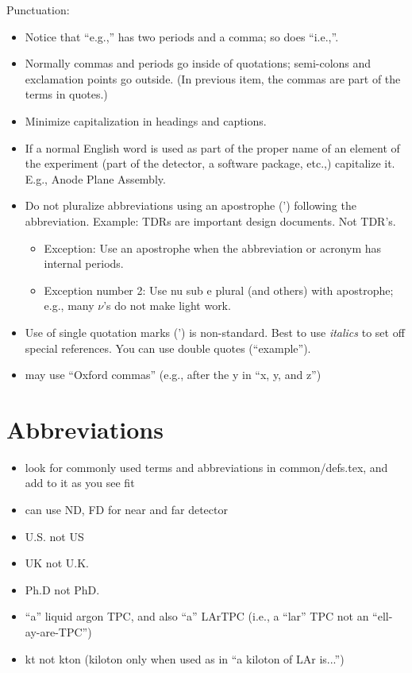 Punctuation:
\begin{itemize}
\item Notice that ``e.g.,'' has two periods and a comma; so does ``i.e.,''.
\item Normally commas and periods go inside of quotations;  semi-colons and exclamation points go outside.  (In previous item, the commas are part of the terms in quotes.)
\item Minimize capitalization in headings and captions.
\item If a normal English word is used as part of the proper name of an element of the experiment (part of the detector, a software package, etc.,) capitalize it. E.g., Anode Plane Assembly. 
\item Do not pluralize abbreviations using an apostrophe (') following the abbreviation. Example: TDRs are important design documents. Not TDR's. 
\begin{itemize}
\item Exception: Use an apostrophe when the abbreviation or acronym has internal periods. 
\item Exception number \num{2}: Use nu sub e plural (and others) with apostrophe; e.g., many $\nu$'s do not make light work.
\end{itemize}
\item Use of single quotation marks (') is non-standard. Best to use \emph{italics} to set off special references. You can use double quotes (``example''). 
\item may use ``Oxford commas'' (e.g., after the y in ``x, y, and z'') 
\end{itemize}


\section{Abbreviations}
\label{sec:english-abbrevs}

\begin{itemize}
\item look for commonly used terms and abbreviations in common/defs.tex, and add to it as you see fit 
\item can use ND, FD for near and far detector
\item U.S. not US
\item UK not U.K. 
\item Ph.D not PhD.
\item ``a'' liquid argon TPC, and also ``a'' LArTPC (i.e., a ``lar'' TPC not an ``ell-ay-are-TPC'') 
\item \si{kt} not \si{kton} (kiloton only when used as in ``a kiloton of LAr is...'') 

\end{itemize}

